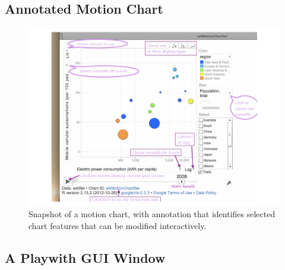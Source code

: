 \documentclass{tufte-book}\usepackage[]{graphicx}\usepackage[]{color}
\begin{document}
\enlargethispage{60pt}

\subsection*{Annotated Motion Chart}

\begin{figure}[h]
\vspace*{-6pt}
\centerline{\includegraphics[scale=0.88]{colorArt/motionchart}}%
\caption{Snapshot of a motion chart, with annotation
  that identifies selected chart features that can be
  modified interactively.\label{col:mchart}}
\vspace*{-18pt}
\end{figure}

\newpage

\subsection*{A Playwith GUI Window}

\enlargethispage{30pt}
\end{document}
